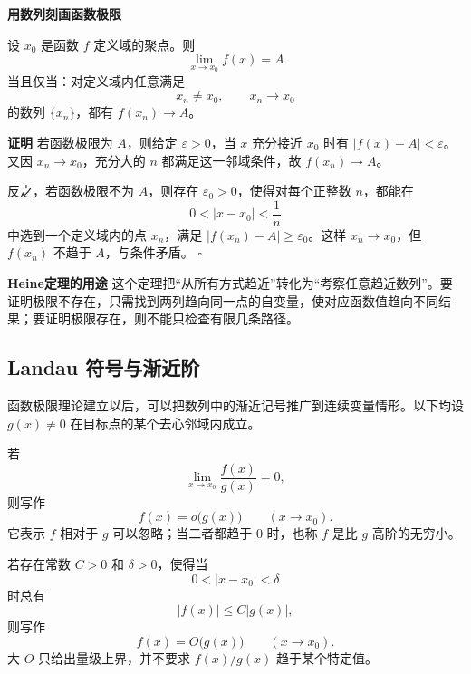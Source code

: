 \documentclass[fontset=fandol]{ctexart}
\newenvironment{extra}{\begin{mdframed}[style=extrastyle, frametitle={* 选读内容（不要求掌握）}]}{\end{mdframed}}
\newenvironment{custom}[1]{\par\noindent\textbf{#1}\quad}{\par\vspace{0.8em}}
\newenvironment{proofdetail}{\par\noindent\textbf{证明}\quad}{\hfill$\square$\par\vspace{0.8em}}
\begin{document}
\begin{extra}

\textbf{用数列刻画函数极限}

\begin{theorem}[Heine定理]
设 \(x_0\) 是函数 \(f\) 定义域的聚点。则
\[
\lim_{x\to x_0}f(x)=A
\]
当且仅当：对定义域内任意满足
\[
x_n\neq x_0,\qquad x_n\to x_0
\]
的数列 \(\{x_n\}\)，都有 \(f(x_n)\to A\)。
\end{theorem}
\begin{proofdetail}
若函数极限为 \(A\)，则给定 \(\varepsilon>0\)，当 \(x\) 充分接近 \(x_0\) 时有 \(|f(x)-A|<\varepsilon\)。又因 \(x_n\to x_0\)，充分大的 \(n\) 都满足这一邻域条件，故 \(f(x_n)\to A\)。

反之，若函数极限不为 \(A\)，则存在 \(\varepsilon_0>0\)，使得对每个正整数 \(n\)，都能在
\[
0<|x-x_0|<\frac1n
\]
中选到一个定义域内的点 \(x_n\)，满足 \(|f(x_n)-A|\geq\varepsilon_0\)。这样 \(x_n\to x_0\)，但 \(f(x_n)\) 不趋于 \(A\)，与条件矛盾。
\end{proofdetail}

\begin{custom}{Heine定理的用途}
这个定理把“从所有方式趋近”转化为“考察任意趋近数列”。要证明极限不存在，只需找到两列趋向同一点的自变量，使对应函数值趋向不同结果；要证明极限存在，则不能只检查有限几条路径。
\end{custom}

\end{extra}


\iffalse
\subsection{Landau 符号与渐近阶}

函数极限理论建立以后，可以把数列中的渐近记号推广到连续变量情形。以下均设 \(g(x)\neq0\) 在目标点的某个去心邻域内成立。

\begin{definition}[函数的小 \(o\) 记号]
若
\[
\lim_{x\to x_0}\frac{f(x)}{g(x)}=0,
\]
则写作
\[
f(x)=o\bigl(g(x)\bigr)\qquad(x\to x_0).
\]
它表示 \(f\) 相对于 \(g\) 可以忽略；当二者都趋于 \(0\) 时，也称 \(f\) 是比 \(g\) 高阶的无穷小。
\end{definition}

\begin{definition}[函数的大 \(O\) 记号]
若存在常数 \(C>0\) 和 \(\delta>0\)，使得当
\[
0<|x-x_0|<\delta
\]
时总有
\[
|f(x)|\le C|g(x)|,
\]
则写作
\[
f(x)=O\bigl(g(x)\bigr)\qquad(x\to x_0).
\]
大 \(O\) 只给出量级上界，并不要求 \(f(x)/g(x)\) 趋于某个特定值。
\end{definition}
\end{document}
